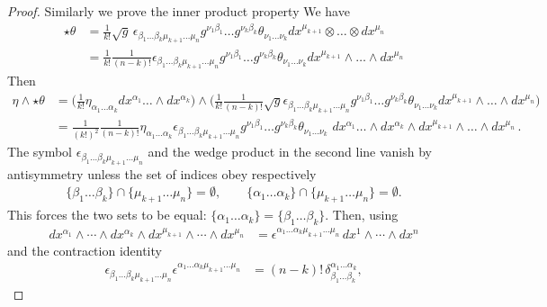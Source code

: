 \documentclass[../geometry_main.tex]{subfiles}
\begin{document}
\begin{proof}
Similarly we prove the inner product property 
We have
{\small\begin{align}
    \star\theta &= \tfrac{1}{k!}\sqrt{g}\, \epsilon_{\beta_1\dots\beta_k\mu_{k+1}\dots\mu_n} g^{\nu_1\beta_1}\dots g^{\nu_k\beta_k} \theta_{\nu_1\dots\nu_k} dx^{\mu_{k+1}}\otimes\dots\otimes dx^{\mu_n}
    \\
    &= \tfrac{1}{k!}\tfrac{1}{(n-k)!} \epsilon_{\beta_1\dots\beta_k\mu_{k+1}\dots\mu_n} g^{\nu_1\beta_1}\dots g^{\nu_k\beta_k} \theta_{\nu_1\dots\nu_k} dx^{\mu_{k+1}}\wedge\dots\wedge dx^{\mu_n}
\end{align}}
Then 
{\small\begin{align}
    \eta\wedge\star\theta
    &= \Big(\tfrac{1}{k!}\eta_{\alpha_1\dots\alpha_k} dx^{\alpha_1}\dots\wedge dx^{\alpha_k}\Big)\wedge 
    \Big(\tfrac{1}{k!}\tfrac{1}{(n-k)!}\sqrt{g} \epsilon_{\beta_1\dots\beta_k\mu_{k+1}\dots\mu_n} g^{\nu_1\beta_1}\dots g^{\nu_k\beta_k} \theta_{\nu_1\dots\nu_k} dx^{\mu_{k+1}}\wedge\dots\wedge dx^{\mu_n}\Big)
    \\
    &=
    \tfrac{1}{(k!)^2}\tfrac{1}{(n-k)!}
    \eta_{\alpha_1\dots\alpha_k}
    \epsilon_{\beta_1\dots\beta_k\mu_{k+1}\dots\mu_n} g^{\nu_1\beta_1}\dots g^{\nu_k\beta_k} \theta_{\nu_1\dots\nu_k} \,\,
    dx^{\alpha_1}\dots\wedge dx^{\alpha_k}\wedge
    dx^{\mu_{k+1}}\wedge\dots\wedge dx^{\mu_n}\,.
\end{align}}
The symbol $\epsilon_{\beta_1\dots\beta_k\mu_{k+1}\dots\mu_n}$ and the wedge product in the second line vanish by antisymmetry unless the set of indices obey respectively
{\small\begin{align}
    \{\beta_1\dots\beta_k\}\cap\{\mu_{k+1}\dots\mu_n\} = \emptyset, \qquad
    \{\alpha_1\dots\alpha_k\}\cap\{\mu_{k+1}\dots\mu_n\} = \emptyset.
\end{align}}
This forces the two sets to be equal: $\{\alpha_1\dots\alpha_k\} = \{\beta_1\dots\beta_k\}$.
Then, using
{\small
\begin{align}
    dx^{\alpha_1}\wedge\cdots\wedge dx^{\alpha_k}
    \wedge dx^{\mu_{k+1}}\wedge\cdots\wedge dx^{\mu_n}
    &=
    \epsilon^{\alpha_1\dots\alpha_k\mu_{k+1}\dots\mu_n}
    \,dx^1\wedge\cdots\wedge dx^n
\end{align}}
and the contraction identity
{\small
\begin{align}
    \epsilon_{\beta_1\dots\beta_k\mu_{k+1}\dots\mu_n}
    \epsilon^{\alpha_1\dots\alpha_k\mu_{k+1}\dots\mu_n}
    &=
    (n-k)!\,
    \delta^{\alpha_1\dots\alpha_k}_{\beta_1\dots\beta_k},
\end{align}}

\end{proof}
\end{document}
